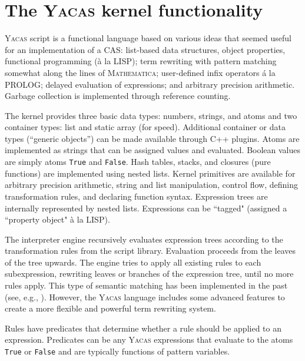 \documentclass{llncs}
\begin{document}
%

\section{The \textsc{Yacas} kernel functionality}

\textsc{Yacas} script is a functional language based on various ideas that
seemed useful for an implementation of a CAS: list-based data structures,
object properties, functional programming (\`{a} la LISP); term rewriting
\cite{BN98} with pattern matching somewhat along the lines of
\textsc{Mathematica}; user-defined infix operators \'{a} la PROLOG; delayed
evaluation of expressions; and arbitrary precision arithmetic. Garbage
collection is implemented through reference counting.


The kernel provides three basic data types: numbers, strings, and atoms and
two container types: list and static array (for speed). Additional container or data types (``generic objects'') can be made available through C++ plugins. Atoms are implemented
as strings that can be assigned values and evaluated. Boolean values are simply
atoms \texttt{True} and \texttt{False}. Hash tables, stacks, and
closures (pure functions) are implemented using nested lists. Kernel primitives are available for arbitrary
precision arithmetic, string and list manipulation, control flow, defining
transformation rules, and declaring function  syntax. Expression trees are
internally represented by nested lists. Expressions can be ``tagged" (assigned a
``property object" \`{a} la LISP).

The interpreter engine recursively evaluates expression trees according to
the transformation rules from the script library.
Evaluation proceeds from the leaves of the tree upwards. The engine tries to apply all existing rules to each subexpression, rewriting leaves or branches of the expression tree, until no more rules apply.
%
This type of semantic matching has been implemented in the past
(see, e.g., \cite{C86}). However, the \textsc{Yacas} language
includes some advanced features to create a more flexible and powerful term
rewriting system.

Rules have predicates that determine whether a
rule should be applied to an expression. Predicates can be any \textsc{Yacas}
expressions that evaluate to the atoms \texttt{True} or \texttt{False} and are typically
functions of pattern variables.
\end{document}
